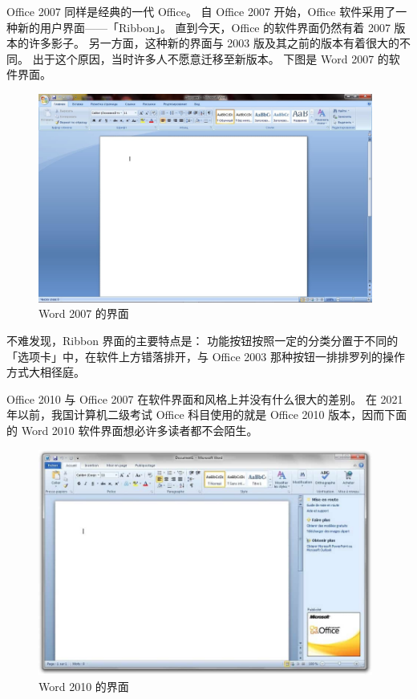 Office 2007 同样是经典的一代 Office。
自 Office 2007 开始，Office 软件采用了一种新的用户界面——「Ribbon」。
直到今天，Office 的软件界面仍然有着 2007 版本的许多影子。
另一方面，这种新的界面与 2003 版及其之前的版本有着很大的不同。
出于这个原因，当时许多人不愿意迁移至新版本。
下图是 Word 2007 的软件界面。

\begin{figure}[htb!]
  \centering
  \includegraphics[width=11cm]{assets/Word_2007.png}
  \caption{Word 2007 的界面}
  \label{Word_2007}
\end{figure}

不难发现，Ribbon 界面的主要特点是：
功能按钮按照一定的分类分置于不同的「选项卡」中，在软件上方错落排开，与 Office 2003 那种按钮一排排罗列的操作方式大相径庭。

Office 2010 与 Office 2007 在软件界面和风格上并没有什么很大的差别。
在 2021 年以前，我国计算机二级考试 Office 科目使用的就是 Office 2010 版本，因而下面的 Word 2010 软件界面想必许多读者都不会陌生。

\begin{figure}[htb!]
  \centering
  \includegraphics[width=11cm]{assets/Word_2010.png}
  \caption{Word 2010 的界面}
  \label{Word_2010}
\end{figure}

